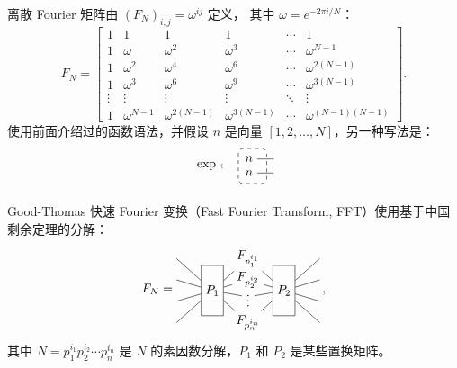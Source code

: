 离散 Fourier 矩阵由 $(F_N)_{i,j}=\omega^{ij}$ 定义，
其中 $\omega = e^{-2\pi i/N}$：
\[
   \renewcommand*{\arraystretch}{1}
F_N =
   \begin{bmatrix}
      1&1&1&1&\cdots &1 \\
      1&\omega&\omega^2&\omega^3&\cdots&\omega^{N-1} \\
      1&\omega^2&\omega^4&\omega^6&\cdots&\omega^{2(N-1)}\\ 1&\omega^3&\omega^6&\omega^9&\cdots&\omega^{3(N-1)}\\
      \vdots&\vdots&\vdots&\vdots&\ddots&\vdots\\
      1&\omega^{N-1}&\omega^{2(N-1)}&\omega^{3(N-1)}&\cdots&\omega^{(N-1)(N-1)}
   \end{bmatrix}
.
\]
使用前面介绍过的函数语法，并假设 $n$ 是向量 $[1, 2, \dots, N]$，另一种写法是：
\[
\begin{tikzpicture}
    \node (exp) at (-.2,0) {$\exp$};
    
    \begin{scope}[xshift=1cm]
        \draw[dashed, rounded corners] (-.3,-0.5) rectangle (.5,0.5);
        \node(n1) at (0,0.2) {$n$};
        \node(n2) at (0,-0.2) {$n$};
        \draw (n1) -- ++(.7,0);
        \draw (n2) -- ++(.7,0);
    \end{scope}
    
    \draw[densely dotted, <-] (exp.east) -- ++(0.5,0);
\end{tikzpicture}
\]

Good-Thomas 快速 Fourier 变换（Fast Fourier Transform, FFT）使用基于中国剩余定理的分解：
\[
F_{N} = 
   \begin{tikzpicture}[baseline=-1em, y=1.7em]
      \node[rectangle, draw, minimum height=4em] (P1) at (0,-.5) {$P_1$};
      \node (A) at (1,1) {$F_{p_1^{i_1}}$};
      \node[rectangle, draw, minimum height=4em] (P2) at (2,-.5) {$P_2$};
      \node (B) at (1,0) {$F_{p_2^{i_2}}$};
      \node (C) at (1,-.8) {$\vdots$};
      \node (D) at (1,-2) {$F_{p_n^{i_n}}$};
      \draw (-1,1) -- (P1) -- (A) -- (P2) -- (3, 1);
      \draw (-1,0) -- (P1) -- (B) -- (P2) -- (3, 0);
      \draw (-1,-1) -- (P1) -- (C) -- (P2) -- (3, -1);
      \draw (-1,-2) -- (P1) -- (D) -- (P2) -- (3, -2);
   \end{tikzpicture}
   \,,
\]
其中 $N = p_1^{i_1} p_2^{i_2} \cdots p_n^{i_n}$ 是 $N$ 的素因数分解，$P_1$ 和 $P_2$ 是某些置换矩阵。

